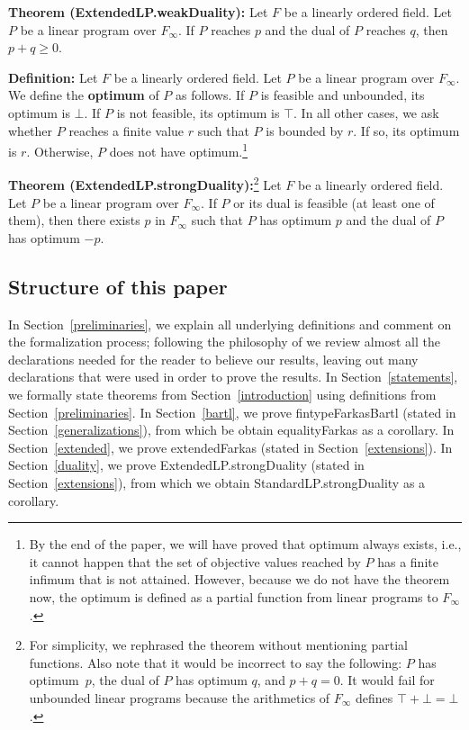 \documentclass[]{article}
\renewcommand{\.}{\hskip .75pt}
\newcommand{\sekt}[1]{Section~\ref{#1}}
\begin{document}
\medskip \noindent
\textbf{Theorem (ExtendedLP.weakDuality):}
Let $F$ be a linearly ordered field.
Let $P$ be a linear program over $F_\infty$.
If $P$ reaches $p$ and the dual of $P$ reaches $q$,
then $p + q \ge 0$.

\medskip \noindent
\textbf{Definition:}
Let $F$ be a linearly ordered field.
Let $P$ be a linear program over $F_\infty$.
We define the \textbf{optimum} of $P$ as follows.
If $P$ is feasible and unbounded, its optimum is $\bot$.
If $P$ is not feasible, its optimum is $\top$.
In all other cases, we ask whether $P$ reaches a finite value $r$ such that
$P$ is bounded by $r$. If so, its optimum is $r$.
Otherwise, $P$ does not have optimum.\footnote{By the end of the paper, we will
have proved that optimum always exists, i.e., it cannot happen that the set of
objective values reached by $P$ has a finite infimum that is not attained.
However, because we do not have the theorem now, the optimum is defined as a partial function
from linear programs to $F_\infty$.}


\medskip \noindent
\textbf{Theorem (ExtendedLP.strongDuality):}\footnote{For simplicity,
we rephrased the theorem without mentioning partial functions.
Also note that it would be incorrect to say the following:
$P$ has optimum~$p$, the dual of $P$ has optimum $q$, and $p + q = 0$.
It would fail for unbounded linear programs because the arithmetics
of $F_\infty$ defines $\top + \bot = \bot$.}
Let $F$ be a linearly ordered field.
Let $P$ be a linear program over $F_\infty$.
If $P$ or its dual is feasible (at least one of them),
then there exists $p$ in $F_\infty$ such that
$P$ has optimum $p$ and the dual of $P$ has optimum $-p$.


\subsection{Structure of this paper}

In \sekt{preliminaries}, we explain all underlying definitions and
comment on the formalization process;
following the philosophy of \cite{Believe}
we review almost all the declarations needed for the reader to believe
our results, leaving out many declarations that were used in order
to prove the results.
In \sekt{statements}, we formally state theorems from \sekt{introduction}
using definitions from \sekt{preliminaries}.
In \sekt{bartl}, we prove fintypeFarkasBartl (stated in \sekt{generalizations}),
from which be obtain equalityFarkas as a corollary.
In \sekt{extended}, we prove extendedFarkas (stated in \sekt{extensions}).
In \sekt{duality}, we prove ExtendedLP.strongDuality
(stated in \sekt{extensions}), from which we obtain
StandardLP.strongDuality as a corollary.
\end{document}

